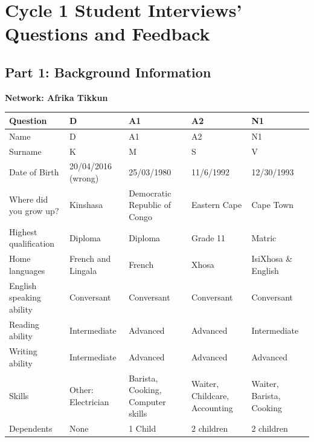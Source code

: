 \appendix

\chapter{Cycle 1 Student Interviews’ Questions and Feedback}
\label{app:cycle1_interviews}

\section{Part 1: Background Information}

\textbf{Network: Afrika Tikkun}

\begin{longtable}{|p{5cm}|p{2cm}|p{2cm}|p{2cm}|p{2cm}|}
\hline
\rowcolor{gray!30}
\textbf{Question} & \textbf{D} & \textbf{A1} & \textbf{A2} & \textbf{N1} \\
\hline

Name & D & A1 & A2 & N1 \\
\hline

Surname & K & M & S & V \\
\hline

Date of Birth & 20/04/2016 (wrong) & 25/03/1980 & 11/6/1992 & 12/30/1993 \\
\hline

Where did you grow up? & Kinshasa & Democratic Republic of Congo & Eastern Cape & Cape Town \\
\hline

Highest qualification & Diploma & Diploma & Grade 11 & Matric \\
\hline

Home languages & French and Lingala & French & Xhosa & IsiXhosa \& English \\
\hline

English speaking ability & Conversant & Conversant & Conversant & Conversant \\
\hline

Reading ability & Intermediate & Advanced & Advanced & Intermediate \\
\hline

Writing ability & Intermediate & Advanced & Advanced & Advanced \\
\hline

Skills & Other: Electrician & Barista, Cooking, Computer skills & Waiter, Childcare, Accounting & Waiter, Barista, Cooking \\
\hline

Dependents & None & 1 Child & 2 children & 2 children \\
\hline

\end{longtable}

